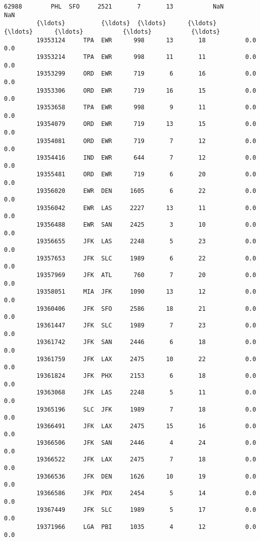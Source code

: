 \documentclass[11pt]{article}
\begin{document}
\begin{Verbatim}[commandchars=\\\{\}]
         62988        PHL  SFO     2521       7       13           NaN           NaN   
         {\ldots}          {\ldots}  {\ldots}      {\ldots}     {\ldots}      {\ldots}           {\ldots}           {\ldots}   
         19353124     TPA  EWR      998      13       18           0.0           0.0   
         19353214     TPA  EWR      998      11       11           0.0           0.0   
         19353299     ORD  EWR      719       6       16           0.0           0.0   
         19353306     ORD  EWR      719      16       15           0.0           0.0   
         19353658     TPA  EWR      998       9       11           0.0           0.0   
         19354079     ORD  EWR      719      13       15           0.0           0.0   
         19354081     ORD  EWR      719       7       12           0.0           0.0   
         19354416     IND  EWR      644       7       12           0.0           0.0   
         19355481     ORD  EWR      719       6       20           0.0           0.0   
         19356020     EWR  DEN     1605       6       22           0.0           0.0   
         19356042     EWR  LAS     2227      13       11           0.0           0.0   
         19356488     EWR  SAN     2425       3       10           0.0           0.0   
         19356655     JFK  LAS     2248       5       23           0.0           0.0   
         19357653     JFK  SLC     1989       6       22           0.0           0.0   
         19357969     JFK  ATL      760       7       20           0.0           0.0   
         19358051     MIA  JFK     1090      13       12           0.0           0.0   
         19360406     JFK  SFO     2586      18       21           0.0           0.0   
         19361447     JFK  SLC     1989       7       23           0.0           0.0   
         19361742     JFK  SAN     2446       6       18           0.0           0.0   
         19361759     JFK  LAX     2475      10       22           0.0           0.0   
         19361824     JFK  PHX     2153       6       18           0.0           0.0   
         19363068     JFK  LAS     2248       5       11           0.0           0.0   
         19365196     SLC  JFK     1989       7       18           0.0           0.0   
         19366491     JFK  LAX     2475      15       16           0.0           0.0   
         19366506     JFK  SAN     2446       4       24           0.0           0.0   
         19366522     JFK  LAX     2475       7       18           0.0           0.0   
         19366536     JFK  DEN     1626      10       19           0.0           0.0   
         19366586     JFK  PDX     2454       5       14           0.0           0.0   
         19367449     JFK  SLC     1989       5       17           0.0           0.0   
         19371966     LGA  PBI     1035       4       12           0.0           0.0   
         

\end{Verbatim}
\end{document}
